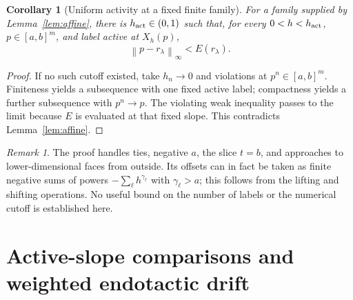 \documentclass[11pt]{article}
\newtheorem{corollary}[theorem]{Corollary}
\theoremstyle{definition}
\theoremstyle{remark}
\newtheorem{remark}[theorem]{Remark}
\newcommand{\norm}[1]{\left\|#1\right\|}
\numberwithin{equation}{section}
\begin{document}
\begin{corollary}[Uniform activity at a fixed finite family]
\label{cor:activity}
For a family supplied by Lemma~\ref{lem:affine}, there is
$h_{\rm act}\in(0,1)$ such that, for every $0<h<h_{\rm act}$,
$p\in[a,b]^m$, and label active at $X_h(p)$,
\[
 \norm{p-r_\lambda}_\infty<E(r_\lambda).
\]
\end{corollary}
\begin{proof}
If no such cutoff existed, take $h_n\to0$ and violations at
$p^n\in[a,b]^m$. Finiteness yields a subsequence with one fixed
active label; compactness yields a further subsequence with
$p^n\to p$. The violating weak inequality passes to the limit
because $E$ is evaluated at that fixed slope. This contradicts
Lemma~\ref{lem:affine}.
\end{proof}

\begin{remark}
The proof handles ties, negative $a$, the slice $t=b$, and
approaches to lower-dimensional faces from outside. Its offsets
can in fact be taken as finite negative sums of powers
$-\sum_\ell h^{\gamma_\ell}$ with $\gamma_\ell>a$; this follows
from the lifting and shifting operations. No useful bound on the
number of labels or the numerical cutoff is established here.
\end{remark}

\section{Active-slope comparisons and weighted endotactic drift}
\label{sec:flux}
\end{document}
